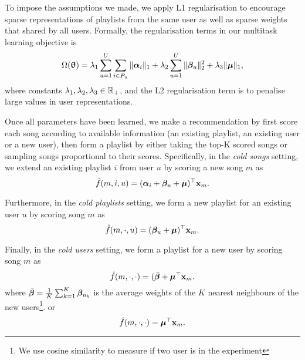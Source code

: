 To impose the assumptions we made, we apply L1 regularisation to encourage sparse representations of playlists from the same user
as well as sparse weights that shared by all users.
%
Formally, the regularisation terms in our multitask learning objective is
\begin{equation}
\label{eq:reg}
\Omega({\bm{\uptheta}}) = \lambda_1 \sum_{u=1}^U \sum_{i \in P_u} \|{\bm{\alpha}}_i\|_1 + \lambda_2 \sum_{u=1}^U \|{\bm{\beta}}_u\|_2^2 + \lambda_3 \| \bm{\mu} \|_1,
\end{equation}
where constants $\lambda_1, \lambda_2, \lambda_3 \in \mathbb{R}_+$,
and the L2 regularisation term is to penalise large values in user representations.

Once all parameters have been learned, 
we make a recommendation by first score each song according to available information (\eg an existing playlist, an existing user or a new user),
then form a playlist by either taking the top-K scored songs or sampling songs proportional to their scores.
Specifically, in the {\it cold songs} setting, 
we extend an existing playlist $i$ from user $u$ by scoring a new song $m$ as
$$
\hat f(m, i, u) = ({\bm{\alpha}}_i + {\bm{\beta}}_u + \bm{\mu})^\top \mathbf{x}_m.
$$

Furthermore, in the {\it cold playlists} setting, 
we form a new playlist for an existing user $u$ by scoring song $m$ as
$$
\hat f(m, \cdot, u) = ({\bm{\beta}}_u + \bm{\mu})^\top \mathbf{x}_m.
$$

Finally, in the {\it cold users} setting, 
we form a playlist for a new user by scoring song $m$ as
$$
\hat f(m, \cdot, \cdot) = (\bar{{\bm{\beta}}} + \bm{\mu}^\top \mathbf{x}_m.
$$
where $\bar{{\bm{\beta}}} = \frac{1}{K} \sum_{k=1}^K {\bm{\beta}}_{u_k}$ is the average weights of the $K$ nearest neighbours
of the new users\footnote{We use cosine similarity to measure if two user is in the experiment}.
or 
$$
\hat f(m, \cdot, \cdot) = \bm{\mu}^\top \mathbf{x}_m.
$$




